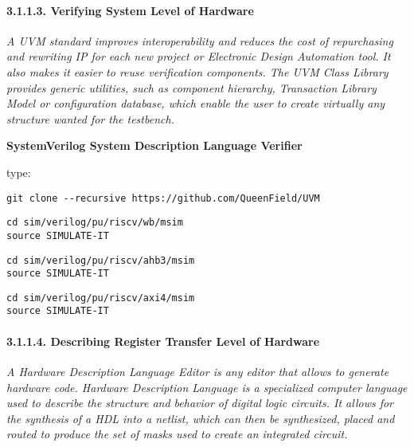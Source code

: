 \documentclass[]{article}
\let\oldparagraph\paragraph
\renewcommand{\paragraph}[1]{\oldparagraph{#1}\mbox{}}
\begin{document}
\hypertarget{verifying-system-level-of-hardware}{%
\paragraph{3.1.1.3. Verifying System Level of
Hardware}\label{verifying-system-level-of-hardware}}

\emph{A UVM standard improves interoperability and reduces the cost of
repurchasing and rewriting IP for each new project or Electronic Design
Automation tool. It also makes it easier to reuse verification
components. The UVM Class Library provides generic utilities, such as
component hierarchy, Transaction Library Model or configuration
database, which enable the user to create virtually any structure wanted
for the testbench.}

\textbf{SystemVerilog System Description Language Verifier}

type:

\begin{verbatim}
git clone --recursive https://github.com/QueenField/UVM
\end{verbatim}

\begin{verbatim}
cd sim/verilog/pu/riscv/wb/msim
source SIMULATE-IT
\end{verbatim}

\begin{verbatim}
cd sim/verilog/pu/riscv/ahb3/msim
source SIMULATE-IT
\end{verbatim}

\begin{verbatim}
cd sim/verilog/pu/riscv/axi4/msim
source SIMULATE-IT
\end{verbatim}

\hypertarget{describing-register-transfer-level-of-hardware}{%
\paragraph{3.1.1.4. Describing Register Transfer Level of
Hardware}\label{describing-register-transfer-level-of-hardware}}

\emph{A Hardware Description Language Editor is any editor that allows
to generate hardware code. Hardware Description Language is a
specialized computer language used to describe the structure and
behavior of digital logic circuits. It allows for the synthesis of a HDL
into a netlist, which can then be synthesized, placed and routed to
produce the set of masks used to create an integrated circuit.}
\end{document}
